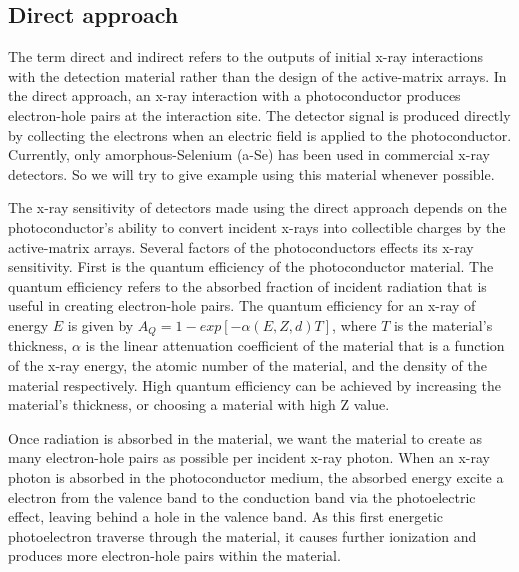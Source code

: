 \subsection{Direct approach}
The term direct and indirect refers to the outputs of initial x-ray interactions with the detection material rather than the design of the active-matrix arrays.  In the direct approach, an x-ray interaction with a photoconductor produces electron-hole pairs at the interaction site.  The detector signal is produced directly by collecting the electrons when an electric field is applied to the photoconductor.  Currently, only amorphous-Selenium (a-Se) has been used in commercial x-ray detectors.  So we will try to give example using this material whenever possible.  

The x-ray sensitivity of detectors made using the direct approach depends on the photoconductor's ability to convert incident x-rays into collectible charges by the active-matrix arrays.  Several factors of the photoconductors effects its x-ray sensitivity.  First is the quantum efficiency of the photoconductor material.  The quantum efficiency refers to the absorbed fraction of incident radiation that is useful in creating electron-hole pairs.  The quantum efficiency for an x-ray of energy $E$ is given by $A_Q = 1 - exp[-\alpha (E, Z, d) T]$, where $T$ is the material's thickness, $\alpha$ is the linear attenuation coefficient of the material that is a function of the x-ray energy, the atomic number of the material, and the density of the material respectively.  High quantum efficiency can be achieved by increasing the material's thickness, or choosing a material with high Z value.  

Once radiation is absorbed in the material, we want the material to create as many electron-hole pairs as possible per incident x-ray photon.  
When an x-ray photon is absorbed in the photoconductor medium, the absorbed energy excite a electron from the valence band to the conduction band via the photoelectric effect, leaving behind a hole in the valence band.  As this first energetic photoelectron traverse through the material, it causes further ionization and produces more electron-hole pairs within the material.  

